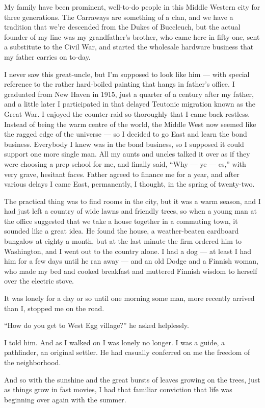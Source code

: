 \documentclass{znotebook}
\begin{document}
My family have been prominent, well-to-do people in this Middle Western city for three generations. The Carraways are something of a clan, and we have a tradition that we're descended from the Dukes of Buccleuch, but the actual founder of my line was my grandfather's brother, who came here in fifty-one, sent a substitute to the Civil War, and started the wholesale hardware business that my father carries on to-day.

I never saw this great-uncle, but I'm supposed to look like him — with special reference to the rather hard-boiled painting that hangs in father's office. I graduated from New Haven in 1915, just a quarter of a century after my father, and a little later I participated in that delayed Teutonic migration known as the Great War. I enjoyed the counter-raid so thoroughly that I came back restless. Instead of being the warm centre of the world, the Middle West now seemed like the ragged edge of the universe — so I decided to go East and learn the bond business. Everybody I knew was in the bond business, so I supposed it could support one more single man. All my aunts and uncles talked it over as if they were choosing a prep school for me, and finally said, ``Why — ye — es,'' with very grave, hesitant faces. Father agreed to finance me for a year, and after various delays I came East, permanently, I thought, in the spring of twenty-two.

The practical thing was to find rooms in the city, but it was a warm season, and I had just left a country of wide lawns and friendly trees, so when a young man at the office suggested that we take a house together in a commuting town, it sounded like a great idea. He found the house, a weather-beaten cardboard bungalow at eighty a month, but at the last minute the firm ordered him to Washington, and I went out to the country alone. I had a dog — at least I had him for a few days until he ran away — and an old Dodge and a Finnish woman, who made my bed and cooked breakfast and muttered Finnish wisdom to herself over the electric stove.

It was lonely for a day or so until one morning some man, more recently arrived than I, stopped me on the road.

``How do you get to West Egg village?'' he asked helplessly.

I told him. And as I walked on I was lonely no longer. I was a guide, a pathfinder, an original settler. He had casually conferred on me the freedom of the neighborhood.

And so with the sunshine and the great bursts of leaves growing on the trees, just as things grow in fast movies, I had that familiar conviction that life was beginning over again with the summer.
\end{document}
